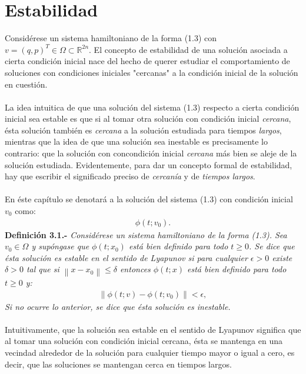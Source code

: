 \section{Estabilidad}
Considérese un sistema hamiltoniano de la forma (1.3) con $v=(q,p)^{T} \in \Omega \subset \mathbb{R}^{2n}$. El concepto de estabilidad de una solución asociada a cierta condición inicial nace del hecho de querer estudiar el comportamiento de soluciones con condiciones iniciales "cercanas" a la condición inicial de la solución en cuestión. 
\\
\\
La idea intuitica de que una solución del sistema (1.3) respecto a cierta condición inicial sea estable es que si al tomar otra solución con condición inicial \textit{cercana}, ésta solución también es \textit{cercana} a la solución estudiada para tiempos \textit{largos}, mientras que la idea de que una solución sea inestable es precisamente lo contrario: que la solución con concondición inicial \textit{cercana} más bien se aleje de la solución estudiada. Evidentemente, para dar un concepto formal de estabilidad, hay que escribir el significado preciso de \textit{cercanía} y de \textit{tiempos largos}.
\\
\\
En éste capítulo se denotará a la solución del sistema (1.3) con condición inicial $v_{0}$ como:
\begin{eqnarray*}
\phi(t;v_{0}).
\end{eqnarray*}
\textbf{Definición 3.1.-} \textit{Considérese un sistema hamiltoniano de la forma (1.3). Sea $v_{0} \in \Omega$ y supóngase que $\phi(t;x_{0})$  está bien definido para todo $t \geq 0$. Se dice que ésta solución es estable en el sentido de Lyapunov si para cualquier $\epsilon > 0$ existe $\delta > 0$ tal que si $\left \| x - x_{0} \right \| \leq \delta $ entonces $\phi(t;x)$  está bien definido para todo $t \geq 0$ y:}
\begin{eqnarray*}
\left \|  \phi(t;v) - \phi(t;v_{0}) \right \| < \epsilon,
\end{eqnarray*}
\textit{Si no ocurre lo anterior, se dice que ésta solución es inestable.}
\\
\\
Intuitivamente, que la solución sea estable en el sentido de Lyapunov significa que al tomar una solución con condición inicial cercana, ésta se mantenga en una vecindad alrededor de la solución para cualquier tiempo mayor o igual a cero, es decir, que las soluciones se mantengan cerca en tiempos largos.
\\
